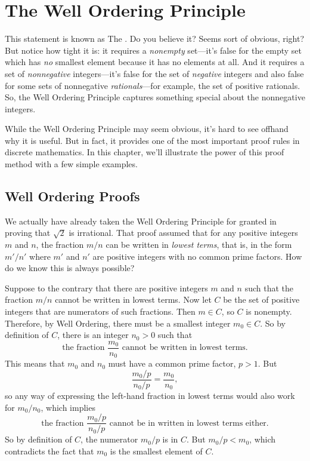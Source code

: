 \chapter{The Well Ordering Principle}\label{well_ordering_chap}


This statement is known as The .  Do you
believe it?  Seems sort of obvious, right?  But notice how tight it is: it
requires a \emph{nonempty} set---it's false for the empty set which has
\emph{no} smallest element because it has no elements at all.  And it
requires a set of \emph{nonnegative} integers---it's false for the set of
\emph{negative} integers and also false for some sets of nonnegative
\emph{rationals}---for example, the set of positive rationals.  So, the
Well Ordering Principle captures something special about the nonnegative
integers.

While the Well Ordering Principle may seem obvious, \iffalse it looks
nothing like the induction axiom, and\fi it's hard to see offhand why
it is useful.  But in fact, it provides one of the most important
proof rules in discrete mathematics.  In this chapter, we'll
illustrate the power of this proof method with a few simple examples.

\iffalse We'll explain this after we introduce a
template for well ordering principle proofs resembling the template in
Section~\ref{templ-induct-proofs} for a proof by strong induction.\fi


\section{Well Ordering Proofs}
We actually have already taken the Well Ordering Principle for granted
in proving that $\sqrt{2}$ is irrational.  That proof assumed that for
any positive integers $m$ and $n$, the fraction $m/n$ can be written
in \emph{lowest terms}, that is, in the form $m'/n'$ where $m'$ and
$n'$ are positive integers with no common prime factors.  How do we
know this is always possible?

Suppose to the contrary that there are positive integers $m$ and $n$
such that the fraction $m/n$ cannot be written in lowest terms.  Now
let $C$ be the set of positive integers that are numerators of such
fractions.  Then $m \in C$, so $C$ is nonempty.  Therefore, by Well
Ordering, there must be a smallest integer $m_0 \in C$.  So by
definition of $C$, there is an integer $n_0 > 0$ such that
\[
\text{the fraction } \frac{m_0}{n_0} \text{ cannot be written in lowest
terms.}
\]
This means that $m_0$ and $n_0$ must have a common prime factor,
$p>1$.  But
\[
\frac{m_0/p}{n_0/p} = \frac{m_0}{n_0},
\]
so any way of expressing the left-hand fraction in lowest terms would
also work for $m_0/n_0$, which implies
\[
\text{the fraction } \frac{m_0/p}{n_0/p} \text{ cannot be in written in
lowest terms either.}
\]
So by definition of $C$, the numerator $m_0/p$ is in $C$.  But $m_0/p <
m_0$, which contradicts the fact that $m_0$ is the smallest element of $C$.

